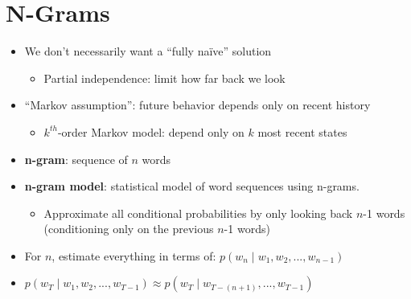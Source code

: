 \documentclass[11pt,letterpaper]{article}
\begin{document}
\section{N-Grams}

\begin{itemize}
  \item We don't necessarily want a ``fully na\"{i}ve'' solution
    \begin{itemize}
      \item Partial independence: limit how far back we look
    \end{itemize}
  \item ``Markov assumption'': future behavior depends only on recent history
    \begin{itemize}
      \item $k^{th}$-order Markov model: depend only on $k$ most recent states
    \end{itemize}
  \item \textbf{n-gram}: sequence of $n$ words
  \item \textbf{n-gram model}: statistical model of word sequences using n-grams.
    \begin{itemize}
      \item Approximate all conditional probabilities by only looking back $n$-1 words (conditioning only on the previous $n$-1 words)
    \end{itemize}

  \item For $n$, estimate everything in terms of: $p(w_n \mid w_1, w_2, ..., w_{n-1})$

  \item $p(w_T \mid w_1, w_2, ..., w_{T-1}) \approx p(w_T \mid w_{T-(n+1)}, ..., w_{T-1})$


\end{itemize}
\end{document}
